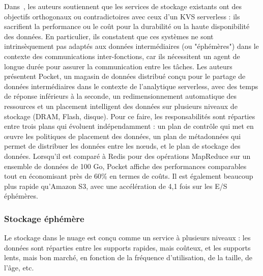 Dans~\cite{Klimovic2018PocketEE}, les auteurs soutiennent que les services de stockage existants ont des objectifs orthogonaux ou contradictoires avec ceux d'un KVS serverless : ils sacrifient la performance ou le coût pour la durabilité ou la haute disponibilité des données. En particulier, ils constatent que ces systèmes ne sont intrinsèquement pas adaptés aux données intermédiaires (ou "éphémères") dans le contexte des communications inter-fonctions, car ils nécessitent un agent de longue durée pour assurer la communication entre les tâches. Les auteurs présentent Pocket, un magasin de données distribué conçu pour le partage de données intermédiaires dans le contexte de l'analytique serverless, avec des temps de réponse inférieurs à la seconde, un redimensionnement automatique des ressources et un placement intelligent des données sur plusieurs niveaux de stockage (DRAM, Flash, disque). Pour ce faire, les responsabilités sont réparties entre trois plans qui évoluent indépendamment : un plan de contrôle qui met en œuvre les politiques de placement des données, un plan de métadonnées qui permet de distribuer les données entre les nœuds, et le plan de stockage des données. Lorsqu'il est comparé à Redis pour des opérations MapReduce sur un ensemble de données de 100 Go, Pocket affiche des performances comparables tout en économisant près de 60\% en termes de coûts. Il est également beaucoup plus rapide qu'Amazon S3, avec une accélération de 4,1 fois sur les E/S éphémères.

\subsubsection{Stockage éphémère}

Le stockage dans le nuage est conçu comme un service à plusieurs niveaux : les données sont réparties entre les supports rapides, mais coûteux, et les supports lents, mais bon marché, en fonction de la fréquence d'utilisation, de la taille, de l'âge, etc.


